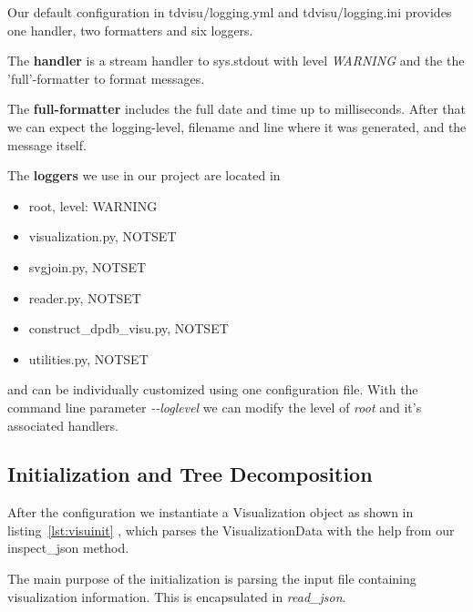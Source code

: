 \documentclass[a4paper, 12pt, bibliography=totoc]{scrartcl}
\begin{document}
Our default configuration in tdvisu/logging.yml and tdvisu/logging.ini provides one handler, two formatters and six loggers.

The \textbf{handler} is a stream handler to sys.stdout with level \textit{WARNING} and the the 'full'-formatter to format messages.

The \textbf{full-formatter} includes the full date and time up to milliseconds. After that we can expect the logging-level, filename and line where it was generated, and the message itself.

The \textbf{loggers} we use in our project are located in 
\begin{itemize}
	\item root, level: WARNING
	\item visualization.py, NOTSET
	\item svgjoin.py, NOTSET
    \item reader.py, NOTSET
	\item construct\_dpdb\_visu.py, NOTSET
	\item utilities.py, NOTSET
\end{itemize}
and can be individually customized using one configuration file.
With the command line parameter \textit{-{}-loglevel} we can modify the level of \textit{root} and it's associated handlers.

\subsection{Initialization and Tree Decomposition}

After the configuration we instantiate a Visualization object as shown in listing~\ref{lst:visuinit} , which parses the VisualizationData with the help from our inspect\_json method. 

The main purpose of the initialization is parsing the input file containing visualization information.
This is encapsulated in \textit{read\_json}.
\end{document}
